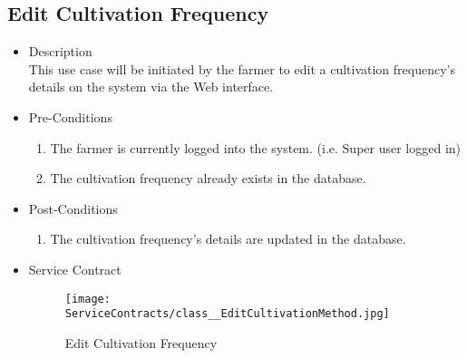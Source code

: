 \documentclass[11pt,fleqn]{book} %
\begin{document}
\subsection{Edit Cultivation Frequency}
\begin{itemize}
	\item Description\\
	This use case will be initiated by the farmer to edit a cultivation frequency’s details on the system via the Web interface.
	\item Pre-Conditions
	\begin{enumerate}
		\item The farmer is currently logged into the system. (i.e. Super user logged in)
		\item The cultivation frequency already exists in the database.					
	\end{enumerate}
	\item Post-Conditions
	\begin{enumerate}
		\item The cultivation frequency’s details are updated in the database.
	\end{enumerate}
	\item Service Contract
	\begin{figure}
		\texttt{[image: ServiceContracts/class\_\_EditCultivationMethod.jpg]}
		\caption{Edit Cultivation Frequency}
	\end{figure}
\end{itemize}
\end{document}
